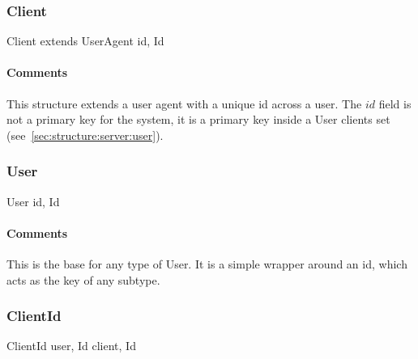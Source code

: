 \documentclass[a4paper,10pt]{article}
\begin{document}
\subsubsection{Client}

\begin{verbbox}
Client extends UserAgent
{
  id, Id
}
\end{verbbox}
\begin{center}
\theverbbox
\end{center}

\begin{inparaitem}[ ]
 \item \infrastructure
\end{inparaitem}

\paragraph*{Comments}
This structure extends a user agent with a unique id across a user. The $id$ field is not a primary key for the system, it is a primary key inside a User clients set
(see~\ref{sec:structure:server:user}).

\subsubsection{User}

\begin{verbbox}
User
{
  id, Id
}
\end{verbbox}
\begin{center}
\theverbbox
\end{center}

\begin{inparaitem}[ ]
 \item \infrastructure
\end{inparaitem}

\paragraph*{Comments}
This is the base for any type of User. It is a simple wrapper around an id, which acts as the key of any subtype.

\subsubsection{ClientId}

\begin{verbbox}
ClientId
{
  user, Id
  client, Id
}
\end{verbbox}
\begin{center}
\theverbbox
\end{center}
\end{document}
